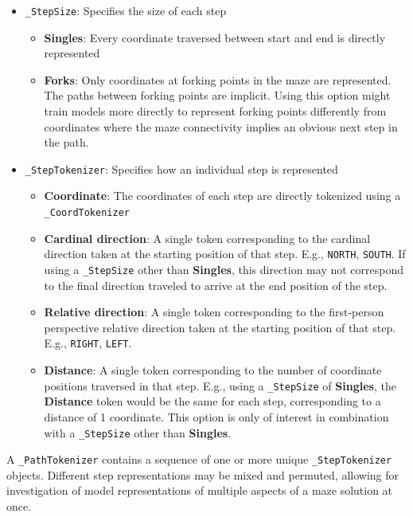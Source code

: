 \documentclass[10pt,a4paper,onecolumn]{article}
\providecommand{\tightlist}{%
  \setlength{\itemsep}{0pt}\setlength{\parskip}{0pt}}
\begin{document}
\begin{itemize}
\tightlist
\item
  \texttt{\_StepSize}: Specifies the size of each step

  \begin{itemize}
  \tightlist
  \item
    \textbf{Singles}: Every coordinate traversed between start and end
    is directly represented
  \item
    \textbf{Forks}: Only coordinates at forking points in the maze are
    represented. The paths between forking points are implicit. Using
    this option might train models more directly to represent forking
    points differently from coordinates where the maze connectivity
    implies an obvious next step in the path.
  \end{itemize}
\item
  \texttt{\_StepTokenizer}: Specifies how an individual step is
  represented

  \begin{itemize}
  \tightlist
  \item
    \textbf{Coordinate}: The coordinates of each step are directly
    tokenized using a \texttt{\_CoordTokenizer}
  \item
    \textbf{Cardinal direction}: A single token corresponding to the
    cardinal direction taken at the starting position of that step.
    E.g., \texttt{NORTH}, \texttt{SOUTH}. If using a \texttt{\_StepSize}
    other than \textbf{Singles}, this direction may not correspond to
    the final direction traveled to arrive at the end position of the
    step.
  \item
    \textbf{Relative direction}: A single token corresponding to the
    first-person perspective relative direction taken at the starting
    position of that step. E.g., \texttt{RIGHT}, \texttt{LEFT}.
  \item
    \textbf{Distance}: A single token corresponding to the number of
    coordinate positions traversed in that step. E.g., using a
    \texttt{\_StepSize} of \textbf{Singles}, the \textbf{Distance} token
    would be the same for each step, corresponding to a distance of 1
    coordinate. This option is only of interest in combination with a
    \texttt{\_StepSize} other than \textbf{Singles}.
  \end{itemize}
\end{itemize}

A \texttt{\_PathTokenizer} contains a sequence of one or more unique
\texttt{\_StepTokenizer} objects. Different step representations may be
mixed and permuted, allowing for investigation of model representations
of multiple aspects of a maze solution at once.
\end{document}
